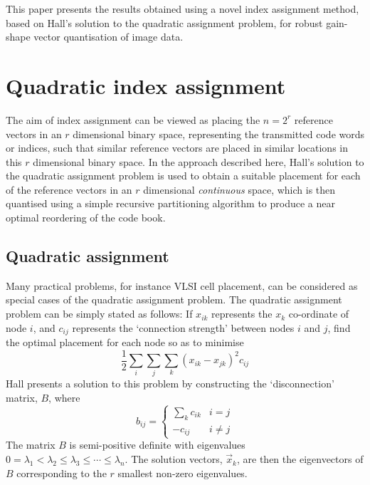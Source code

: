 \documentclass[a4paper]{report}
\begin{document}
This paper presents the results obtained using a novel index assignment
method, based on Hall's solution to the quadratic
assignment problem, for robust gain-shape vector quantisation of
image data.

\chapter{Quadratic index assignment}

The aim of index assignment can be viewed as placing the $n=2^r$ reference
vectors in an $r$ dimensional binary space, representing the transmitted code
words or indices, such that similar reference vectors are placed in similar
locations in this $r$ dimensional binary space.  In the approach described
here, Hall's solution to the quadratic assignment problem is used
to obtain a suitable placement for each of the reference vectors in an $r$
dimensional \emph{continuous} space, which is then quantised using a simple
recursive partitioning algorithm to produce a near optimal reordering of the
code book.

\section{Quadratic assignment}

Many practical problems, for instance VLSI cell placement, can
be considered as special cases of the quadratic assignment problem.  The
quadratic assignment problem can be simply stated as follows:  If $x_{ik}$
represents the $x_k$ co-ordinate of node $i$, and $c_{ij}$ represents the
`connection strength' between nodes $i$ and $j$, find the optimal placement
for each node so as to minimise
%
\begin{displaymath}
   \frac{1}{2}\sum_i\sum_j\sum_k(x_{ik}-x_{jk})^2c_{ij}
\end{displaymath}
%
Hall presents a solution to this problem by constructing the
`disconnection' matrix, $B$, where
%
\begin{displaymath}
   b_{ij} =
   \left\{
   \begin{array}{ll}
   \sum_k c_{ik} & i = j\\
   -c_{ij} & i \neq j
   \end{array}
   \right.
\end{displaymath}
%
The matrix $B$ is semi-positive definite with eigenvalues
$0 = \lambda_1 < \lambda_2 \leq \lambda_3 \leq \cdots \leq \lambda_n$.
The solution vectors, $\vec{x}_k$, are then the eigenvectors of $B$
corresponding to the $r$ smallest non-zero eigenvalues.
\end{document}

